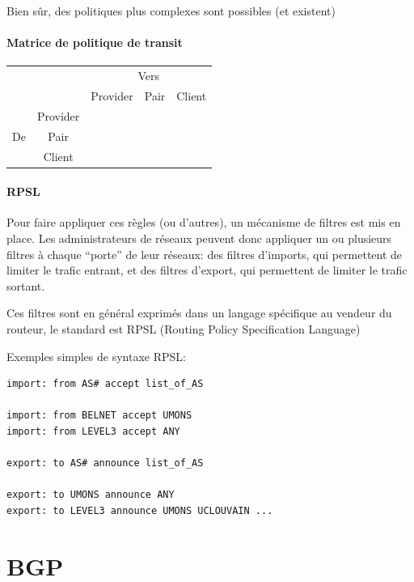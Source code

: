 \documentclass{article}
\begin{document}
\begin{sffamily}
Bien sûr, des politiques plus complexes sont possibles (et existent)

\paragraph{Matrice de politique de transit}

\begin{tabular}{c|c|c|c|c|}
  \multicolumn{2}{c|}{} & \multicolumn{3}{c|}{Vers} \\
  \cline{3-5}
  \multicolumn{2}{c|}{} & Provider & Pair & Client \\
  \hline
  \multirow{3}{*}{De} & Provider & \color{red}{Non} & \color{red}{Non} &
     \color{green}{Oui} \\
  \cline{2-5}
  & Pair & \color{red}{Non} & \color{red}{Non} & \color{green}{Oui} \\
  \cline{2-5}
  & Client & \color{green}{Oui} & \color{green}{Oui} & \color{green}{Oui} \\
  \hline
\end{tabular}

\paragraph{RPSL}

Pour faire appliquer ces règles (ou d'autres), un mécanisme de filtres
est mis en place. Les administrateurs de réseaux peuvent donc
appliquer un ou plusieurs filtres à chaque ``porte'' de leur réseaux:
des filtres d'imports, qui permettent de limiter le trafic entrant, et
des filtres d'export, qui permettent de limiter le trafic sortant.

Ces filtres sont en général exprimés dans un langage spécifique au
vendeur du routeur, le standard est RPSL (Routing Policy Specification
Language)

Exemples simples de syntaxe RPSL:

\begin{verbatim}
import: from AS# accept list_of_AS

import: from BELNET accept UMONS
import: from LEVEL3 accept ANY

export: to AS# announce list_of_AS

export: to UMONS announce ANY
export: to LEVEL3 announce UMONS UCLOUVAIN ...
\end{verbatim}

\section{BGP}


\end{sffamily}
\end{document}
